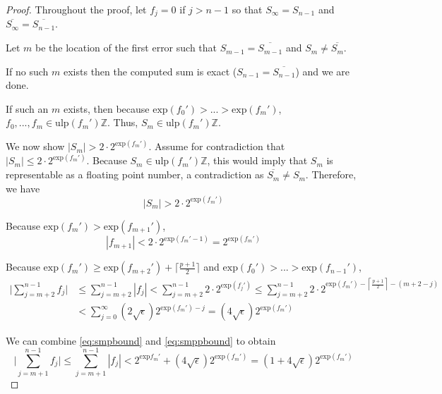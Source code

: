 \documentclass[12pt]{article}
\providecommand{\Z}{\ensuremath{\mathbb{Z}}}
\providecommand{\exp}{\ensuremath{\text{exp}}}
\providecommand{\ulp}{\ensuremath{\text{ulp}}}
\theoremstyle{definition}
\numberwithin{equation}{section}
\numberwithin{figure}{section}
\begin{document}
    \begin{proof}

      Throughout the proof, let $f_j = 0$ if $j > n - 1$ so that $S_{\infty} = S_{n - 1}$ and $\overline{S_{\infty}} = \overline{S_{n - 1}}$.

      Let $m$ be the location of the first error such that $S_{m - 1} = \overline{S_{m - 1}}$ and $S_{m} \neq \overline{S_{m}}$.

      If no such $m$ exists then the computed sum is exact ($S_{n - 1} = \overline{S_{n - 1}}$) and we are done.

      If such an $m$ exists, then because $\exp(f_0') > ... > \exp(f_m')$, $f_0, ..., f_m \in \ulp(f_m')\Z$. Thus, $S_m \in \ulp(f_m')\Z$.

      We now show $|S_m| > 2 \cdot 2^{\exp(f_m')}$. Assume for contradiction that $|S_m| \leq 2 \cdot 2^{\exp(f_m')}$. Because $S_m \in \ulp(f_m')\Z$, this would imply that $S_m$ is representable as a floating point number, a contradiction as $\overline{S_m} \neq S_m$. Therefore, we have
      \begin{equation}
        |S_m| > 2 \cdot 2^{\exp(f_m')}
        \label{eq:smbound}
      \end{equation}

      Because $\exp(f_m') > \exp(f_{m + 1}')$,
      \begin{equation}
        |f_{m + 1}| < 2\cdot2^{\exp(f_m' - 1)} = 2^{\exp(f_m')}
        \label{eq:smpbound}
      \end{equation}

      Because $\exp(f_m') \geq \exp(f_{m + 2}') + \lceil\frac{p + 1}{2}\rceil$ and $\exp(f_0') > ... > \exp(f_{n - 1}')$,
      \begin{align}
        \bigl|\sum \limits_{j = m + 2}^{n - 1} f_j\bigr| &\leq \sum \limits_{j = m + 2}^{n - 1} |f_j| < \sum \limits_{j = m + 2}^{n - 1} 2 \cdot 2^{\exp(f_j')} \leq \sum \limits_{j = m + 2}^{n - 1} 2 \cdot 2^{\exp(f_m') - \left\lceil\frac{p + 1}{2}\right\rceil - (m + 2 - j)} \nonumber \\
        &< \sum \limits_{j = 0}^{\infty} \left(2 \sqrt{\epsilon}\right)2^{\exp(f_m') - j} = \left(4\sqrt\epsilon\right)2^{\exp(f_m')}
        \label{eq:smppbound}
      \end{align}

      We can combine  \eqref{eq:smpbound} and \eqref{eq:smppbound} to obtain
      \begin{equation}
        \bigl|\sum\limits_{j = m + 1}^{n - 1} f_j\bigr| \leq \sum\limits_{j = m + 1}^{n - 1} |f_j| < 2^{\exp{f_m'}} + \left(4 \sqrt{\epsilon}\right) 2^{\exp(f_m')} = \left(1 + 4 \sqrt\epsilon \right)2^{\exp(f_m')}
        \label{eq:smsbound}
      \end{equation}


\end{proof}
\end{document}
